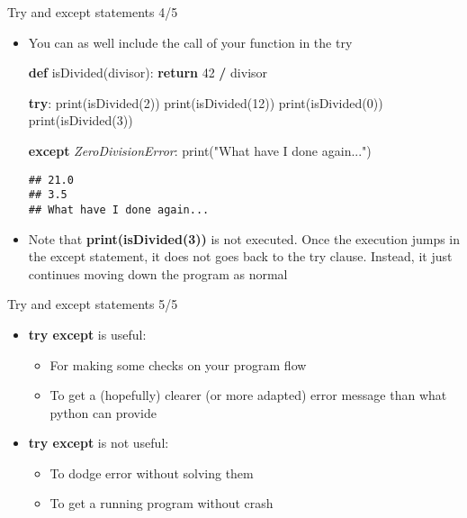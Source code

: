 \documentclass[
  8pt,
  ignorenonframetext,
]{beamer}
\newenvironment{Shaded}{\begin{snugshade}}{\end{snugshade}}
\newcommand{\BuiltInTok}[1]{#1}
\newcommand{\ControlFlowTok}[1]{\textcolor[rgb]{0.13,0.29,0.53}{\textbf{#1}}}
\newcommand{\DecValTok}[1]{\textcolor[rgb]{0.00,0.00,0.81}{#1}}
\newcommand{\KeywordTok}[1]{\textcolor[rgb]{0.13,0.29,0.53}{\textbf{#1}}}
\newcommand{\NormalTok}[1]{#1}
\newcommand{\OperatorTok}[1]{\textcolor[rgb]{0.81,0.36,0.00}{\textbf{#1}}}
\newcommand{\PreprocessorTok}[1]{\textcolor[rgb]{0.56,0.35,0.01}{\textit{#1}}}
\newcommand{\StringTok}[1]{\textcolor[rgb]{0.31,0.60,0.02}{#1}}
\providecommand{\tightlist}{%
  \setlength{\itemsep}{0pt}\setlength{\parskip}{0pt}}
\begin{document}
\begin{frame}[fragile]{Try and except statements 4/5}
\protect\hypertarget{try-and-except-statements-45}{}
\begin{itemize}[<+->]
\item
  You can as well include the call of your function in the try

\begin{Shaded}
\begin{Highlighting}[]
\KeywordTok{def}\NormalTok{ isDivided(divisor):}
  \ControlFlowTok{return} \DecValTok{42} \OperatorTok{/}\NormalTok{ divisor}

\ControlFlowTok{try}\NormalTok{:}
  \BuiltInTok{print}\NormalTok{(isDivided(}\DecValTok{2}\NormalTok{))}
  \BuiltInTok{print}\NormalTok{(isDivided(}\DecValTok{12}\NormalTok{))}
  \BuiltInTok{print}\NormalTok{(isDivided(}\DecValTok{0}\NormalTok{))}
  \BuiltInTok{print}\NormalTok{(isDivided(}\DecValTok{3}\NormalTok{))}

\ControlFlowTok{except} \PreprocessorTok{ZeroDivisionError}\NormalTok{:}
  \BuiltInTok{print}\NormalTok{(}\StringTok{"What have I done again..."}\NormalTok{)}
\end{Highlighting}
\end{Shaded}

\begin{verbatim}
## 21.0
## 3.5
## What have I done again...
\end{verbatim}
\end{itemize}

\begin{itemize}[<+->]
\tightlist
\item
  Note that \textbf{print(isDivided(3))} is not executed. Once the
  execution jumps in the except statement, it does not goes back to the
  try clause. Instead, it just continues moving down the program as
  normal
\end{itemize}
\end{frame}

\begin{frame}{Try and except statements 5/5}
\protect\hypertarget{try-and-except-statements-55}{}
\begin{itemize}
\tightlist
\item
  \textbf{try except} is useful:

  \begin{itemize}
  \tightlist
  \item
    For making some checks on your program flow
  \item
    To get a (hopefully) clearer (or more adapted) error message than
    what python can provide
  \end{itemize}
\item
  \textbf{try except} is not useful:

  \begin{itemize}
  \tightlist
  \item
    To dodge error without solving them
  \item
    To get a running program without crash
  \end{itemize}
\end{itemize}
\end{frame}
\end{document}
